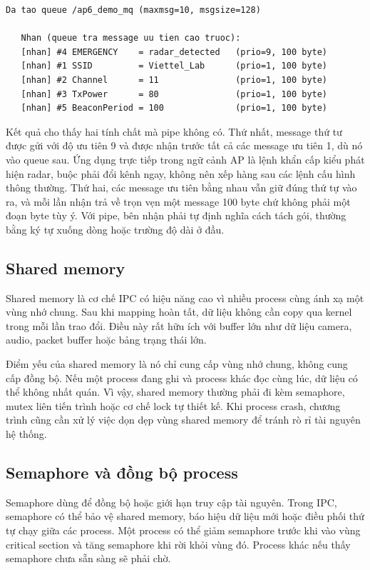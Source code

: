 \documentclass[11pt]{article}
\begin{document}
\begin{lstlisting}[caption={Message queue giữ ranh giới message và tôn trọng độ ưu tiên}]
Da tao queue /ap6_demo_mq (maxmsg=10, msgsize=128)

   Nhan (queue tra message uu tien cao truoc):
   [nhan] #4 EMERGENCY    = radar_detected   (prio=9, 100 byte)
   [nhan] #1 SSID         = Viettel_Lab      (prio=1, 100 byte)
   [nhan] #2 Channel      = 11               (prio=1, 100 byte)
   [nhan] #3 TxPower      = 80               (prio=1, 100 byte)
   [nhan] #5 BeaconPeriod = 100              (prio=1, 100 byte)
\end{lstlisting}

Kết quả cho thấy hai tính chất mà pipe không có. Thứ nhất, message thứ tư được gửi với độ ưu tiên 9 và được nhận trước tất cả các message ưu tiên 1, dù nó vào queue sau. Ứng dụng trực tiếp trong ngữ cảnh AP là lệnh khẩn cấp kiểu phát hiện radar, buộc phải đổi kênh ngay, không nên xếp hàng sau các lệnh cấu hình thông thường. Thứ hai, các message ưu tiên bằng nhau vẫn giữ đúng thứ tự vào ra, và mỗi lần nhận trả về trọn vẹn một message 100 byte chứ không phải một đoạn byte tùy ý. Với pipe, bên nhận phải tự định nghĩa cách tách gói, thường bằng ký tự xuống dòng hoặc trường độ dài ở đầu.

\subsection{Shared memory}

Shared memory là cơ chế IPC có hiệu năng cao vì nhiều process cùng ánh xạ một vùng nhớ chung. Sau khi mapping hoàn tất, dữ liệu không cần copy qua kernel trong mỗi lần trao đổi. Điều này rất hữu ích với buffer lớn như dữ liệu camera, audio, packet buffer hoặc bảng trạng thái lớn.

Điểm yếu của shared memory là nó chỉ cung cấp vùng nhớ chung, không cung cấp đồng bộ. Nếu một process đang ghi và process khác đọc cùng lúc, dữ liệu có thể không nhất quán. Vì vậy, shared memory thường phải đi kèm semaphore, mutex liên tiến trình hoặc cơ chế lock tự thiết kế. Khi process crash, chương trình cũng cần xử lý việc dọn dẹp vùng shared memory để tránh rò rỉ tài nguyên hệ thống.

\subsection{Semaphore và đồng bộ process}

Semaphore dùng để đồng bộ hoặc giới hạn truy cập tài nguyên. Trong IPC, semaphore có thể bảo vệ shared memory, báo hiệu dữ liệu mới hoặc điều phối thứ tự chạy giữa các process. Một process có thể giảm semaphore trước khi vào vùng critical section và tăng semaphore khi rời khỏi vùng đó. Process khác nếu thấy semaphore chưa sẵn sàng sẽ phải chờ.
\end{document}
